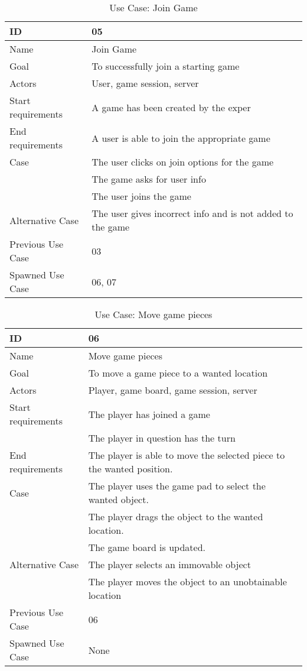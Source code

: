\begin{table}[H]
\begin{tabular}{|l|l|}
\hline
	\textbf{ID} & \textbf{05}\\ \hline
	Name & Join Game\\ \hline
	Goal & To successfully join a starting game\\ \hline
	Actors & User, game session, server \\ \hline
	Start requirements & A game has been created by the exper\\ \hline
	End requirements & A user is able to join the appropriate game\\ \hline
	Case & The user clicks on join options for the game\\
			& The game asks for user info \\
			& The user joins the game \\ \hline
	Alternative Case & The user gives incorrect info and is not added to the game \\ \hline
	Previous Use Case & 03 \\ \hline
	Spawned Use Case & 06, 07\\ \hline
\end{tabular}
\caption{Use Case: Join Game}
\label{fig:usecase05table}
\end{table}



\begin{table}[H]
\begin{tabular}{|l|l|}
\hline
	\textbf{ID} & \textbf{06}\\ \hline
	Name & Move game pieces \\ \hline
	Goal & To move a game piece to a wanted location \\ \hline
	Actors & Player, game board, game session, server \\ \hline
	Start requirements & The player has joined a game \\
				& The player in question has the turn \\ \hline
	End requirements & The player is able to move the selected piece to the wanted position. \\ \hline
	Case & The player uses the game pad to select the wanted object. \\
		& The player drags the object to the wanted location. \\
		& The game board is updated. \\ \hline
	Alternative Case & The player selects an immovable object \\
				& The player moves the object to an unobtainable location\\ \hline
	Previous Use Case & 06 \\ \hline
	Spawned Use Case & None\\ \hline
\end{tabular}
\caption{Use Case: Move game pieces}
\label{fig:usecase06table}
\end{table}

